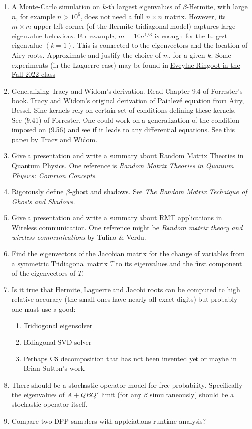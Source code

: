 \documentclass{article}
\begin{document}
\begin{enumerate}
    \item A Monte-Carlo simulation on $k$-th largest eigenvalues of $\beta$-Hermite, with large $n$, for example $n>10^6$, does not need a full $n\times n$ matrix. However, its $m\times m$ upper left corner (of the Hermite tridiagonal model) captures large eigenvalue behaviors. For example, $m=10 n^{1/3}$ is enough for the largest eigenvalue $(k=1)$. This is connected to the eigenvectors and the location of Airy roots. Approximate and justify the choice of $m$, for a given $k$. Some experiments (in the Laguerre case) may be found in \href{https://github.com/mitmath/18338/blob/master/projects/2022/EveylneRingoot/er_report.pdf}{\color{blue}Eveylne Ringoot in the Fall 2022 class}
    \item Generalizing Tracy and Widom's derivation. Read Chapter 9.4 of Forrester's book. Tracy and Widom's original derivation of Painlev{\'e} equation from Airy, Bessel, Sine kernels rely on certain set of conditions defining these kernels. See (9.41) of Forrester. One could work on a generalization of the condition imposed on (9.56) and see if it leads to any differential equations. See this paper by \href{https://link.springer.com/article/10.1007/BF02101734}{\color{blue}Tracy and Widom}.
    \item Give a presentation and write a summary about Random Matrix Theories in Quantum Physics. One reference is \href{http://arxiv.org/abs/cond-mat/9707301}{\emph{\color{blue}Random Matrix Theories in Quantum Physics: Common Concepts}}.
    \item Rigorously define $\beta$-ghost and shadows. See \href{https://math.mit.edu/~edelman/publications/random_matrix_technique.pdf}{\emph{\color{blue}The Random Matrix Technique of Ghosts and Shadows}}. 
    \item Give a presentation and write a summary about RMT applications in Wireless communication. One reference might be \emph{Random matrix theory and wireless communications} by Tulino \& Verdu.
    \item Find the eigenvectors of the Jacobian matrix for the change of variables from a symmetric Tridiagonal matrix $T$ to its eigenvalues and the first component of the eigenvectors of $T$.
    \item Is it true that Hermite, Laguerre and Jacobi roots can be computed to high relative accuracy (the small ones have nearly all exact digits) but probably one must use a good: 
    \begin{enumerate}
        \item Tridiogonal eigensolver
        \item Bidiagonal SVD solver
        \item Perhaps CS decomposition that has not been invented yet or maybe in Brian Sutton's work.
    \end{enumerate}
    \item There should be a stochastic operator model for free probability. Specifically the eigenvalues of $A+QBQ'$ limit (for any $\beta$ simultaneously) should be a stochastic operator itself.
    \item Compare two DPP samplers with applciations runtime analysis?
\end{enumerate}
\end{document}
